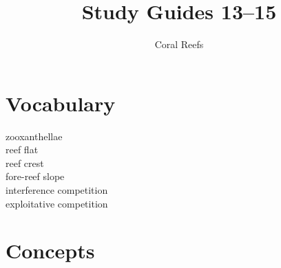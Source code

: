 \documentclass[nofonts, letterpaper]{tufte-handout}
\title{Study Guides 13--15}
\author{Coral Reefs}
\date{} %
\begin{document}
\maketitle	%


\section{Vocabulary}
\vspace{-1\baselineskip}
\begin{multicols}{2}
zooxanthellae \\
reef flat \\
reef crest \\
fore-reef slope \\
interference competition \\
exploitative competition
\end{multicols}

\section{Concepts}
\end{document}
